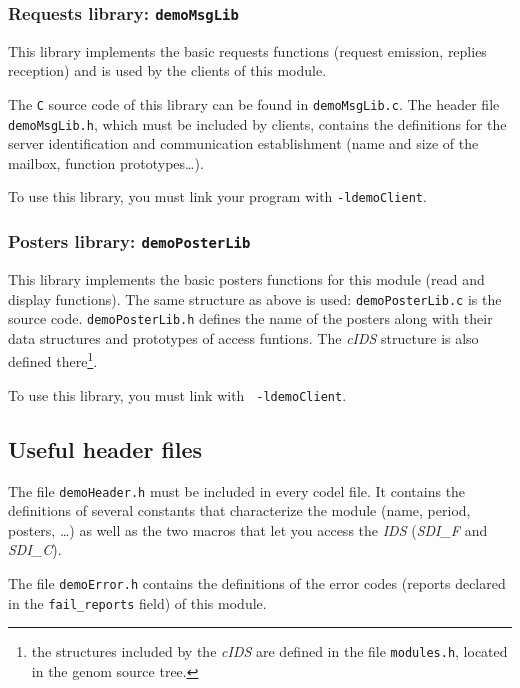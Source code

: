 \subsubsection{Requests library: \texttt{demoMsgLib}}

This library implements  the basic requests  functions (request emission,
replies reception) and is used by the clients of this module.

The \texttt{C}  source code    of  this  library  can be   found  in  
\texttt{demoMsgLib.c}.  The header
file \texttt{demoMsgLib.h}, which must  be included by clients, contains the
definitions for the server identification and communication establishment
(name and size of the mailbox, function prototypes\ldots).

To use this  library, you must link your  program with  
\texttt{-ldemoClient}. 


\subsubsection{Posters library: \texttt{demoPosterLib}}

This library implements the basic posters functions for this module (read
and display   functions).  The same    structure as above  is used:  
\texttt{demoPosterLib.c} is  the  source code. 
\texttt{demoPosterLib.h}   defines the name  of  the
posters along  with  their data structures and prototypes of access
funtions.
The  \emph{cIDS} structure is
also defined there\footnote{the structures included by the \emph{cIDS} are
defined in the file \texttt{modules.h}, located in the genom source tree.}.

To  use this library,  you must link  with  \texttt{
-ldemoClient}.


\subsection{Useful header files}

The file \texttt{demoHeader.h} must  be included  in every  codel file.  It
contains the definitions of several constants that characterize the module
(name, period, posters, \ldots)  as well as the two  macros that let  you
access the \emph{IDS} (\emph{SDI\_F} and \emph{SDI\_C}).

The file  \texttt{demoError.h} contains the  definitions of the  error codes
(reports declared in the \texttt{fail\_reports} field) of this module.

